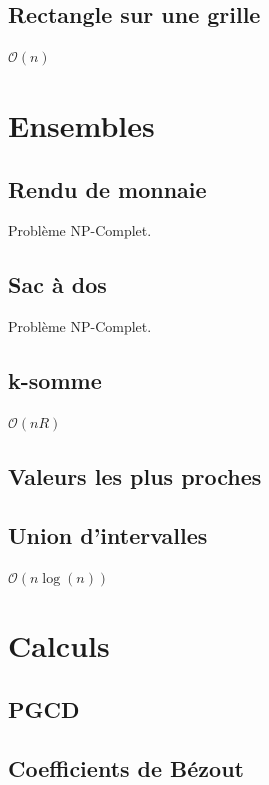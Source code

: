 \documentclass[8pt]{article}
\begin{document}
        \subsection{Rectangle sur une grille}
        $\mathcal{O}(n)$
        {\scriptsize}
    \section{Ensembles}
        \subsection{Rendu de monnaie}
        Problème NP-Complet.
        {\scriptsize}
        \subsection{Sac à dos}
        Problème NP-Complet.
        {\scriptsize}
        \subsection{k-somme}
        $\mathcal{O}(nR)$
        {\scriptsize}
        \subsection{Valeurs les plus proches}
        {\scriptsize}
        \subsection{Union d'intervalles}
        $\mathcal{O}(n \log(n))$
        {\scriptsize}
    \section{Calculs}
        \subsection{PGCD}
        {\scriptsize}
        \subsection{Coefficients de Bézout}
        {\scriptsize}
\end{document}
